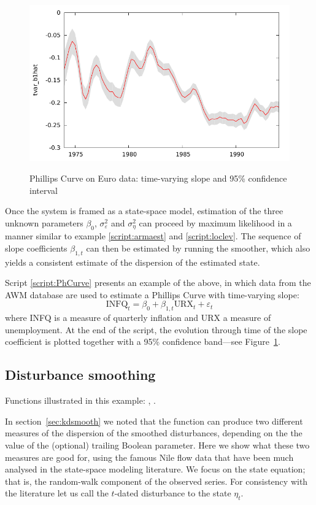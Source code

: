 \begin{figure}[htbp]
  \centering
    \includegraphics{figures/timevar_PhCurve} \\[10pt]
  \caption{Phillips Curve on Euro data: time-varying slope and
    95\% confidence interval}
  \label{fig:tvar}
\end{figure}

Once the system is framed as a state-space model, estimation of the
three unknown parameters $\beta_0$, $\sigma^2_{\varepsilon}$ and
$\sigma^2_{\eta}$ can proceed by maximum likelihood in a manner
similar to example \ref{script:armaest} and \ref{script:loclev}. The
sequence of slope coefficients $\beta_{1,t}$ can then be estimated by
running the smoother, which also yields a consistent estimate of the
dispersion of the estimated state.

Script \ref{script:PhCurve} presents an example of the above, in which
data from the AWM database are used to estimate a Phillips Curve
with time-varying slope:
\[
\mbox{INFQ}_t = \beta_0 + \beta_{1,t} \mbox{URX}_t + \varepsilon_t
\]
where INFQ is a measure of quarterly inflation and URX a measure of
unemployment.  At the end of the script, the evolution through time of
the slope coefficient is plotted together with a 95\% confidence
band---see Figure~\ref{fig:tvar}.


\subsection{Disturbance smoothing}
\label{sec:example_dsmooth}

Functions illustrated in this example: , .

In section~\ref{sec:kdsmooth} we noted that the 
function can produce two different measures of the dispersion of the
smoothed disturbances, depending on the the value of the (optional)
trailing Boolean parameter. Here we show what these two measures are
good for, using the famous Nile flow data that have been much analysed
in the state-space modeling literature. We focus on the state
equation; that is, the random-walk component of the observed series.
For consistency with the literature let us call the $t$-dated
disturbance to the state $\eta_t$.

